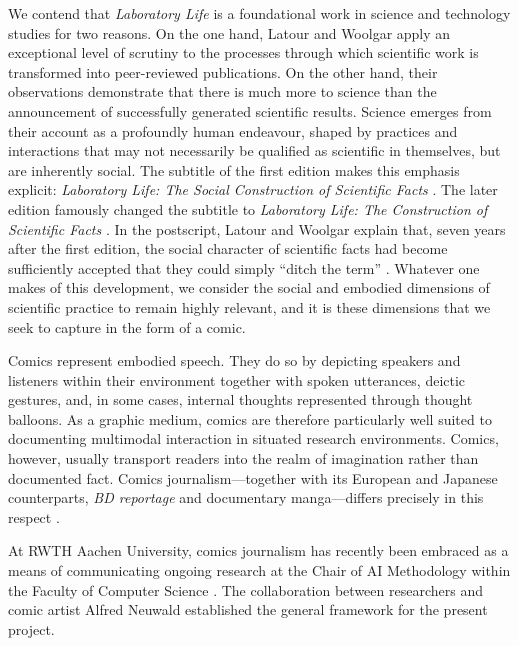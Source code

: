 \documentclass{inggrid}
\begin{document}
We contend that \textit{Laboratory Life} is a foundational work in science and technology studies for two reasons. On the one hand, Latour and Woolgar apply an exceptional level of scrutiny to the processes through which scientific work is transformed into peer-reviewed publications. On the other hand, their observations demonstrate that there is much more to science than the announcement of successfully generated scientific results. Science emerges from their account as a profoundly human endeavour, shaped by practices and interactions that may not necessarily be qualified as scientific in themselves, but are inherently social. The subtitle of the first edition makes this emphasis explicit: \textit{Laboratory Life: The Social Construction of Scientific Facts} \cite{latour_laboratory_1979}. The later edition famously changed the subtitle to \textit{Laboratory Life: The Construction of Scientific Facts} \cite{latour_laboratory_1986}. In the postscript, Latour and Woolgar explain that, seven years after the first edition, the social character of scientific facts had become sufficiently accepted that they could simply \enquote{ditch the term} \cite{latour_laboratory_1986}. Whatever one makes of this development, we consider the social and embodied dimensions of scientific practice to remain highly relevant, and it is these dimensions that we seek to capture in the form of a comic. 

Comics represent embodied speech. They do so by depicting speakers and listeners within their environment together with spoken utterances, deictic gestures, and, in some cases, internal thoughts represented through thought balloons. As a graphic medium, comics are therefore particularly well suited to documenting multimodal interaction in situated research environments. Comics, however, usually transport readers into the realm of imagination rather than documented fact. Comics journalism---together with its European and Japanese counterparts, \textit{BD reportage} and documentary manga---differs precisely in this respect \cite{bak_comics_2026, bak_mangix_2024}.

At RWTH Aachen University, comics journalism has recently been embraced as a means of communicating ongoing research at the Chair of AI Methodology within the Faculty of Computer Science \cite{neuwald_deus_2026}. The collaboration between researchers and comic artist Alfred Neuwald established the general framework for the present project. 
\end{document}
